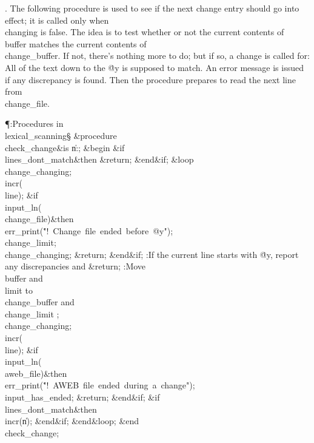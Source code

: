 . The following procedure is used to see if the next change entry should
go into effect; it is called only when \\{changing} is false.
The idea is to test whether or not the current
contents of \\{buffer} matches the current contents of \\{change\_buffer}.
If not, there's nothing more to do; but if so, a change is called for:
All of the text down to the \.{@y} is supposed to match. An error
message is issued if any discrepancy is found. Then the procedure
prepares to read the next line from \\{change\_file}.

\Y\P\?\4:Procedures in \\{lexical\_scanning}\X\mathrel{+}\S\?\6
\&{procedure}\8\1\\{check\_change}\2\8\&{is}\8\1\6
\|n\?:\?\?\K{};\6
\4\&{begin}\6
\&{if}\1\1\8\\{lines\_dont\_match}\2\8\&{then}\6
\&{return};\2\6
\&{end}\8\2\&{if}\1;\6
\1\&{loop}\6
\\{change\_changing};\6
\\{incr}\?\1(\?\\{line}\?\2)\?;\6
\&{if}\1\1\?\8\R\?\\{input\_ln}\?\1(\?\\{change\_file}\?\2)\?\2\8\&{then}\6
\\{err\_print}\?\1(\?\.{"!\ Change\ file\ ended\ before\ @y"}\?\2)\?;\6
\\{change\_limit}\?\K{};\5
\\{change\_changing};\6
\&{return};\2\6
\&{end}\8\2\&{if}\1;\6
:If the current line starts with \.{@y}, report any discrepancies and %
\&{return}\X;\6
:Move \\{buffer} and \\{limit} to \\{change\_buffer} and \\{change\_limit}%
\X;\6
\\{change\_changing};\6
\\{incr}\?\1(\?\\{line}\?\2)\?;\6
\&{if}\1\1\?\8\R\?\\{input\_ln}\?\1(\?\\{aweb\_file}\?\2)\?\2\8\&{then}\6
\\{err\_print}\?\1(\?\.{"!\ AWEB\ file\ ended\ during\ a\ change"}\?\2)\?;\6
\\{input\_has\_ended}\?\K\?;\5
\&{return};\2\6
\&{end}\8\2\&{if}\1;\6
\&{if}\1\1\8\\{lines\_dont\_match}\2\8\&{then}\6
\\{incr}\?\1(\?\|n\?\2)\?;\2\6
\&{end}\8\2\&{if}\1;\2\6
\&{end}\8\&{loop};\2\6
\&{end}\8\\{check\_change};\par
\fi

